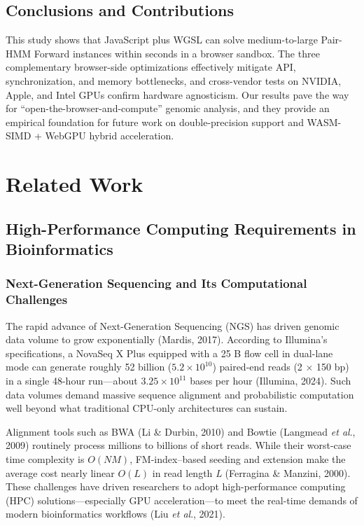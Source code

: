 \documentclass[PhD]{PHlab-thesis}
\begin{document}
\section{Conclusions and Contributions}
This study shows that JavaScript plus WGSL can solve medium-to-large Pair-HMM Forward instances within seconds in a browser sandbox. The three complementary browser-side optimizations effectively mitigate API, synchronization, and memory bottlenecks, and cross-vendor tests on NVIDIA, Apple, and Intel GPUs confirm hardware agnosticism. Our results pave the way for “open-the-browser-and-compute” genomic analysis, and they provide an empirical foundation for future work on double-precision support and WASM-SIMD + WebGPU hybrid acceleration.


\chapter{Related Work}

\section{High-Performance Computing Requirements in Bioinformatics}

\subsection{Next-Generation Sequencing and Its Computational Challenges}
The rapid advance of Next-Generation Sequencing (NGS) has driven genomic data volume to grow exponentially (Mardis, 2017). According to Illumina's specifications, a NovaSeq X Plus equipped with a 25 B flow cell in dual-lane mode can generate roughly 52 billion ($5.2 \times 10^{10}$) paired-end reads (2 $\times$ 150 bp) in a single 48-hour run—about $3.25 \times 10^{11}$ bases per hour (Illumina, 2024). Such data volumes demand massive sequence alignment and probabilistic computation well beyond what traditional CPU-only architectures can sustain.

Alignment tools such as BWA (Li \& Durbin, 2010) and Bowtie (Langmead \emph{et al}., 2009) routinely process millions to billions of short reads. While their worst-case time complexity is $O(NM)$, FM-index–based seeding and extension make the average cost nearly linear $O(L)$ in read length \emph{L} (Ferragina \& Manzini, 2000). These challenges have driven researchers to adopt high-performance computing (HPC) solutions—especially GPU acceleration—to meet the real-time demands of modern bioinformatics workflows (Liu \emph{et al}., 2021).
\end{document}
